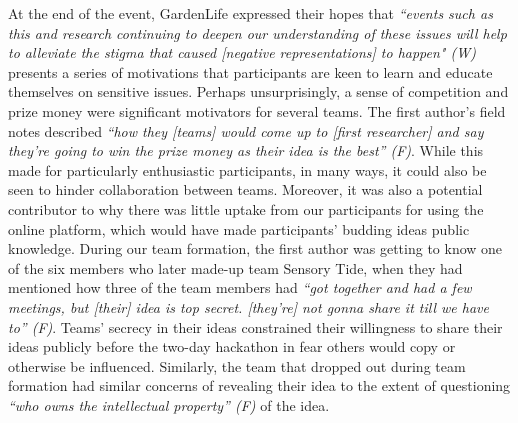At the end of the event, GardenLife expressed their hopes that \textit{“events such as this and research continuing to deepen our understanding of these issues will help to alleviate the stigma that caused [negative representations] to happen" (W)} presents a series of motivations that participants are keen to learn and educate themselves on sensitive issues. Perhaps unsurprisingly, a sense of competition and prize money were significant motivators for several teams. The first author’s field notes described \textit{“how they [teams] would come up to [first researcher] and say they’re going to win the prize money as their idea is the best” (F)}. While this made for particularly enthusiastic participants, in many ways, it could also be seen to hinder collaboration between teams. Moreover, it was also a potential contributor to why there was little uptake from our participants for using the online platform, which would have made participants’ budding ideas public knowledge. During our team formation, the first author was getting to know one of the six members who later made-up team Sensory Tide, when they had mentioned how three of the team members had \textit{“got together and had a few meetings, but [their] idea is top secret. [they’re] not gonna share it till we have to” (F)}. Teams’ secrecy in their ideas constrained their willingness to share their ideas publicly before the two-day hackathon in fear others would copy or otherwise be influenced. Similarly, the team that dropped out during team formation had similar concerns of revealing their idea to the extent of questioning \textit{“who owns the intellectual property” (F)} of the idea. 

